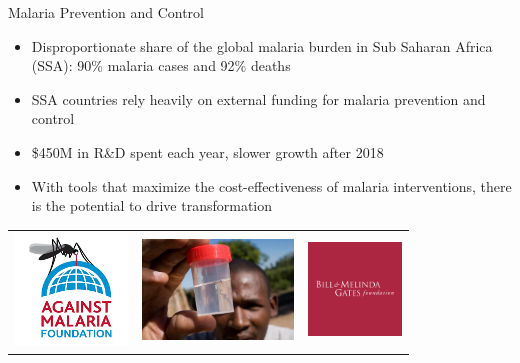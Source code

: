 \documentclass{beamer}
\begin{document}
\begin{frame}{Malaria Prevention and Control}
\begin{itemize}

\item Disproportionate share of the global malaria burden in Sub Saharan Africa (SSA): 90\% malaria cases and 92\% deaths 

\item SSA countries rely heavily on external funding for malaria prevention and control \cite{Winskill2011}

\item  \$450M in R\&D spent each year, slower growth after 2018 \cite{moran2007malaria}

\item With tools that maximize the cost-effectiveness of malaria interventions, there is the potential to drive transformation

\end{itemize}

% 
% 

\centering
        \begin{tabular}{ccc}
        
        \includegraphics[width=3cm]{images/AMF.png}
        &
         \includegraphics[width=4cm]{images/Research.jpg}
         &
         \includegraphics[width=2.5cm]{images/BillM.jpg}
        

\end{tabular}
\end{frame}
\end{document}
